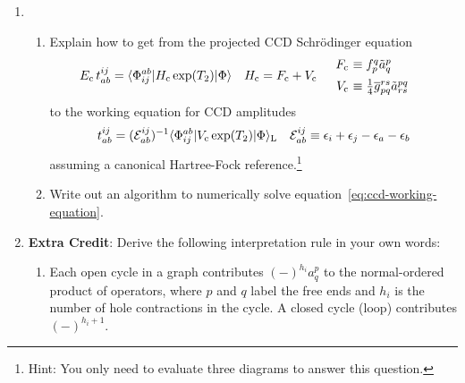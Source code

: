 \documentclass[11pt]{article}
\begin{document}
\begin{enumerate}
\newpage
\item
  \begin{enumerate}
  \item
    Explain how to get from the projected CCD Schr\"odinger equation
    \begin{align}
      E_\mr{c}\,t_{ab}^{ij}
    =
      \ip{\F_{ij}^{ab}|H_\mr{c}\,\mr{exp}(T_2)|\F}
    &&
        H_\mr{c}
      &=
        F_\mr{c}
      +
        V_\mr{c}
    &&
      \begin{array}{r@{\ }l}
        F_\mr{c}
      &\equiv
        f_p^q
        \tl{a}^p_q
      \\[5pt]
        V_\mr{c}
      &\equiv
        \tfr{1}{4}
        \ol{g}_{pq}^{rs}
        \tl{a}^{pq}_{rs}
      \end{array}
    \end{align}
    to the working equation for CCD amplitudes
    \begin{align}
    \label{eq:ccd-working-equation}
      t_{ab}^{ij}
    =
      (\mathcal{E}_{ab}^{ij})^{-1}
      \langle\Phi _{ij}^{ab}|V_{\mathrm{c}}\,\mathrm{exp}(T_2)|\Phi \rangle_{\mathrm{L}}
    &&
      \mathcal{E}_{ab}^{ij}
    \equiv
      \epsilon _i
    +
      \epsilon _j
    -
      \epsilon _a
    -
      \epsilon _b
    \end{align}
    assuming a canonical Hartree-Fock reference.\footnote{Hint: 
    You only need to evaluate three diagrams to answer this question.}

  \item
    Write out an algorithm to numerically solve equation~\ref{eq:ccd-working-equation}.
  \end{enumerate}


\newpage
\item[]
  \textbf{Extra Credit}:
  Derive the following interpretation rule in your own words:
  \begin{enumerate}
  \item[]
    Each open cycle in a graph contributes $(-)^{h_i}a^p_q$ to the normal-ordered product of operators, where $p$ and $q$ label the free ends and $h_i$ is the number of hole contractions in the cycle.
  A closed cycle (loop) contributes $(-)^{h_i+1}$.
  \end{enumerate}
\end{enumerate}
\end{document}

